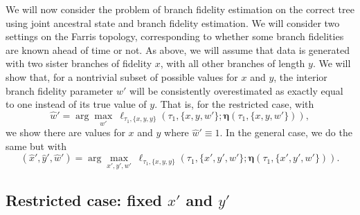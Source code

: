 \documentclass{article}
\newcommand{\fullAncestralSplitPartitions}{\boldsymbol\eta}
\begin{document}
We will now consider the problem of branch fidelity estimation on the correct tree using joint ancestral state and branch fidelity estimation.
We will consider two settings on the Farris topology, corresponding to whether some branch fidelities are known ahead of time or not.
As above, we will assume that data is generated with two sister branches of fidelity $x$, with all other branches of length $y$.
We will show that, for a nontrivial subset of possible values for $x$ and $y$, the interior branch fidelity parameter $w'$ will be consistently overestimated as exactly equal to one instead of its true value of $y$.
That is, for the restricted case, with
$$
\hat{w}' = \arg\max_{w'} \ \ell_{\tau_1,\{x,y,y\}}(\tau_1, \{x,y,w'\}; \fullAncestralSplitPartitions(\tau_1,\{x,y,w'\})),
$$
we show there are values for $x$ and $y$ where $\hat{w}'\equiv 1$.
In the general case, we do the same but with
$$
(\hat{x}', \hat{y}', \hat{w}') = \arg\max_{x',y',w'} \ \ell_{\tau_1,\{x,y,y\}}(\tau_1, \{x',y',w'\}; \fullAncestralSplitPartitions(\tau_1,\{x',y',w'\})).
$$

\subsection{Restricted case: fixed $x'$ and $y'$}
\end{document}
